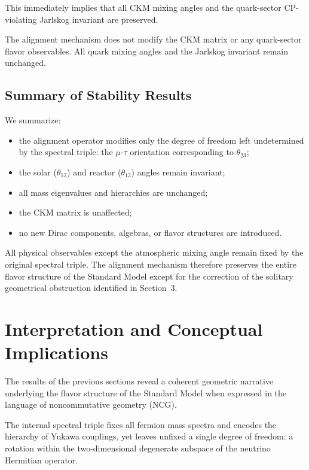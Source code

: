 This immediately implies that all CKM mixing angles and the quark-sector CP-violating Jarlskog invariant are preserved.

\begin{corollary}
The alignment mechanism does not modify the CKM matrix or any quark-sector flavor observables. All quark mixing angles and the Jarlskog invariant remain unchanged.
\end{corollary}

\subsection{Summary of Stability Results}

We summarize:
\begin{itemize}
\item the alignment operator modifies only the degree of freedom left undetermined by the spectral triple: the $\mu$-$\tau$ orientation corresponding to $\theta_{23}$;
\item the solar ($\theta_{12}$) and reactor ($\theta_{13}$) angles remain invariant;
\item all mass eigenvalues and hierarchies are unchanged;
\item the CKM matrix is unaffected;
\item no new Dirac components, algebras, or flavor structures are introduced.
\end{itemize}

All physical observables except the atmospheric mixing angle remain fixed by the original spectral triple. The alignment mechanism therefore preserves the entire flavor structure of the Standard Model except for the correction of the solitary geometrical obstruction identified in Section~3.


\section{Interpretation and Conceptual Implications}

The results of the previous sections reveal a coherent geometric narrative underlying the flavor structure of the Standard Model when expressed in the language of noncommutative geometry (NCG).

The internal spectral triple fixes all fermion mass spectra and encodes the hierarchy of Yukawa couplings, yet leaves unfixed a single degree of freedom: a rotation within the two-dimensional degenerate subspace of the neutrino Hermitian operator.

